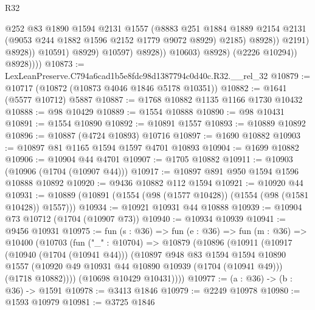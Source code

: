 \begin{lexlean}{R32}
\begin{coremodule}
                                      @252
                                      @83
                                      @1890
                                      @1594
                                      @2131
                                      @1557
                                      (@8883
                                        @251
                                        @1884
                                        @1889
                                        @2154
                                        @2131
                                        (@9053 @244 @1882 @1596 @2152 @1779 @9072 @8929)
                                        @2185)
                                      @8928))
                                  @2191)
                                @8928))
                            @10591)
                          @8929)
                        @10597)
                      @8928))
                  @10603)
                @8928)
              (@2226 @10294))
            @8928))))
@10873 := LexLeanPreserve.C794a6cad1b5e8fdc98d1387794c0d40c.R32.__rel_32
@10879 := @10717 (@10872 (@10873 @4046 @1846 @5178 @10351))
@10882 := @1641 (@5577 @10712) @5887
@10887 := @1768 @10882 @1135 @1166 @1730 @10432
@10888 := @98 @10429
@10889 := @1554 @10888
@10890 := @98 @10431
@10891 := @1554 @10890
@10892 := @10891 @1557
@10893 := @10889 @10892
@10896 := @10887 (@4724 @10893) @10716
@10897 := @1690 @10882
@10903 := @10897 @81 @1165 @1594 @1597 @4701 @10893
@10904 := @1699 @10882
@10906 := @10904 @44 @4701
@10907 := @1705 @10882
@10911 := @10903 (@10906 (@1704 (@10907 @44)))
@10917 := @10897 @891 @950 @1594 @1596 @10888 @10892
@10920 := @9436 @10882 @112 @1594
@10921 := @10920 @44
@10931 := @10889 (@10891 (@1554 (@98 (@1577 @10428)) (@1554 (@98 (@1581 @10428)) @1557)))
@10934 := @10921 @10931 @44 @10888
@10939 := @10904 @73 @10712 (@1704 (@10907 @73))
@10940 := @10934 @10939
@10941 := @9456 @10931
@10975 := fun (s : @36) =>
  fun (e : @36) =>
  fun (m : @36) =>
  @10400
    (@10703
      (fun ("_" : @10704) =>
      @10879
        (@10896
          (@10911
            (@10917
              (@10940 (@1704 (@10941 @44)))
              (@10897
                @948
                @83
                @1594
                @1594
                @10890
                @1557
                (@10920 @49 @10931 @44 @10890 @10939 (@1704 (@10941 @49)))
                (@1718 @10882))))
          (@10698 @10429 @10431))))
@10977 := (a : @36) -> (b : @36) -> @1591
@10978 := @3413 @1846
@10979 := @2249 @10978
@10980 := @1593 @10979
@10981 := @3725 @1846

\end{coremodule}
\end{lexlean}
